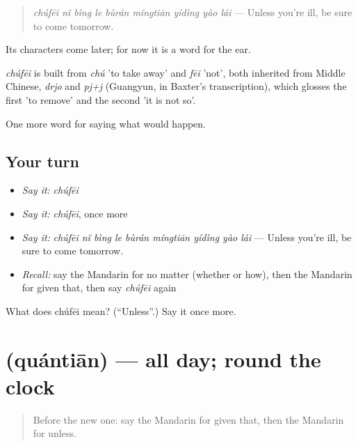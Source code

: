 \begin{quote}
\emph{chúfēi nǐ bìng le bùrán míngtiān yídìng yào lái} — Unless you're ill, be sure to come tomorrow.
\end{quote}

Its characters come later; for now it is a word for the ear.

\begin{cousinweb}
\emph{chúfēi} is built from \emph{chú} 'to take away' and \emph{fēi} 'not', both inherited from Middle Chinese, \emph{drjo} and \emph{pj+j} (Guangyun, in Baxter's transcription), which glosses the first 'to remove' and the second 'it is not so'.
\end{cousinweb}

\begin{grammarlens}[title={What you've built}]
One more word for saying what would happen.
\end{grammarlens}

\subsection*{Your turn}
\begin{itemize}
\raggedright
  \item \emph{Say it:} \emph{chúfēi}
  \item \emph{Say it:} \emph{chúfēi}, once more
  \item \emph{Say it:} \emph{chúfēi nǐ bìng le bùrán míngtiān yídìng yào lái} — Unless you're ill, be sure to come tomorrow.
  \item \emph{Recall:} say the Mandarin for no matter (whether or how), then the Mandarin for given that, then say \emph{chúfēi} again
\end{itemize}

\begin{tcolorbox}[breakable,colback=teal!4,colframe=teal!35!black,title={Before you move on}]
What does chúfēi mean? (\textquotedblleft{}Unless\textquotedblright{}.) Say it once more.
\end{tcolorbox}
\section[\texorpdfstring{\zh{全天} (quántiān)}{全天 (quántiān)}]{ (quántiān) — all day; round the clock}

\label{lesson:ZH-C396-quantian}



\begin{quote}
Before the new one: say the Mandarin for given that, then the Mandarin for unless.
\end{quote}

